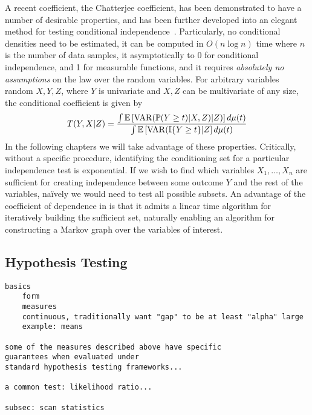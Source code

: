 A recent coefficient, the Chatterjee coefficient, has been demonstrated to have a number of desirable properties, and has been further developed into an elegant method for testing conditional independence~\citep{abc,abc}. 
Particularly,
no conditional densities need to be estimated,
it can be computed in $O(n\log n)$ time where $n$ is the number of data samples,
it asymptotically to 0 for conditional independence, and 1 for measurable functions,
and it requires \textit{absolutely no assumptions} on the law over the random variables.
For arbitrary variables random $X,Y,Z$, where $Y$ is univariate and $X,Z$ can be multivariate of any size, the conditional coefficient is given  by
\begin{align}\label{eq:contcodec}
    T(Y,X|Z) = \frac{\int\mathbb{E}\left[\operatorname*{VAR}(\mathbb{P}(Y\geq t)|X,Z)|Z)\right]d\mu(t)}{\int\mathbb{E}\left[\operatorname*{VAR}(\mathbb{I}\{Y\geq t\}|Z\right] d\mu(t)}
\end{align}
In the following chapters we will take advantage of these properties. Critically, without a specific procedure, identifying the conditioning set for a particular independence test is exponential. If we wish to find which variables $X_1,\ldots,X_n$ are sufficient for creating independence between some outcome $Y$ and the rest of the variables, na\"ively we would need to test all possible subsets.
An advantage of the coefficient of dependence in \cite{abc} is that it admits a linear time algorithm for iteratively building the sufficient set, naturally enabling an algorithm for constructing a Markov graph over the variables of interest.

\subsection{Hypothesis Testing}
\begin{verbatim}
basics
    form
    measures
    continuous, traditionally want "gap" to be at least "alpha" large
    example: means

some of the measures described above have specific 
guarantees when evaluated under
standard hypothesis testing frameworks...

a common test: likelihood ratio...

subsec: scan statistics
\end{verbatim}
